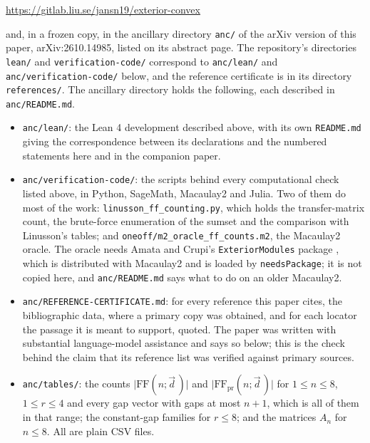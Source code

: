\documentclass[11pt, a4paper, abstract=yes]{scrartcl}
\theoremstyle{definition}
\theoremstyle{remark}
\theoremstyle{plain}
\let\autocite\cite
\begin{document}
\begin{center}
\url{https://gitlab.liu.se/jansn19/exterior-convex}
\end{center}

\noindent and, in a frozen copy, in the ancillary directory \texttt{anc/} of the arXiv version of this paper,
arXiv:2610.14985, listed on its abstract page. The repository's directories \texttt{lean/} and
\texttt{verification-code/} correspond to \texttt{anc/lean/} and \texttt{anc/verification-code/} below, and the
reference certificate is in its directory \texttt{references/}. The ancillary directory holds the
following, each described in \texttt{anc/README.md}.

\begin{itemize}
\item \texttt{anc/lean/}: the Lean 4 development described above, with its own \texttt{README.md} giving the
correspondence between its declarations and the numbered statements here and in the companion
paper.
\item \texttt{anc/verification-code/}: the scripts behind every computational check listed above, in Python,
SageMath, Macaulay2 and Julia. Two of them do most of the work: \texttt{linusson\_ff\_counting.py},
which holds the transfer-matrix count, the brute-force enumeration of the sumset and the
comparison with Linusson's tables; and \texttt{oneoff/m2\_oracle\_ff\_counts.m2}, the Macaulay2 oracle.
The oracle needs Amata and Crupi's \texttt{ExteriorModules} package \autocite{AmataCrupi2021}, which is
distributed with Macaulay2 and is loaded by \texttt{needsPackage}; it is not copied here, and
\texttt{anc/README.md} says what to do on an older Macaulay2.
\item \texttt{anc/REFERENCE-CERTIFICATE.md}: for every reference this paper cites, the bibliographic data,
where a primary copy was obtained, and for each locator the passage it is meant to support,
quoted. The paper was written with substantial language-model assistance and says so below;
this is the check behind the claim that its reference list was verified against primary sources.
\item \texttt{anc/tables/}: the counts \(\lvert\mathrm{FF}(n;\vec d\,)\rvert\) and
\(\lvert\mathrm{FF}_{\mathrm{pr}}(n;\vec d\,)\rvert\) for \(1\le n\le 8\), \(1\le r\le 4\) and every
gap vector with gaps at most \(n+1\), which is all of them in that range; the constant-gap
families for \(r\le 8\); and the matrices \(A_n\) for \(n\le 8\). All are plain CSV files.
\end{itemize}
\end{document}
